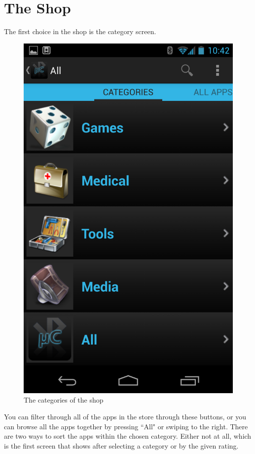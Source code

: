 \chapter{The Shop}
The first choice in the shop is the category screen.\\
\newline
\begin{figure}[H]
	\centering
	\includegraphics[scale = 0.3]{images/Screenshots/category_view.png}
	\caption{The categories of the shop}
\end{figure}
\newline
You can filter through all of the apps in the store through these buttons, or you can browse all the apps together by pressing ``All" or swiping to the right. There are two ways to sort the apps within the chosen category. Either not at all, which is the first screen that shows after selecting a category or by the given rating. \\
